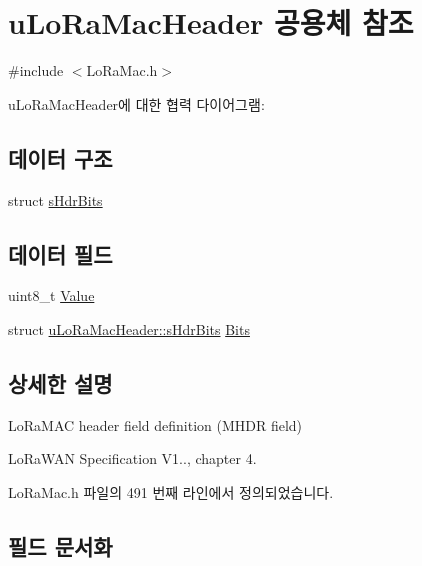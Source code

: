 \hypertarget{unionu_lo_ra_mac_header}{}\section{u\+Lo\+Ra\+Mac\+Header 공용체 참조}
\label{unionu_lo_ra_mac_header}


{\ttfamily \#include $<$Lo\+Ra\+Mac.\+h$>$}



u\+Lo\+Ra\+Mac\+Header에 대한 협력 다이어그램\+:
\subsection*{데이터 구조}
\begin{DoxyCompactItemize}
\item 
struct \mbox{\hyperlink{structu_lo_ra_mac_header_1_1s_hdr_bits}{s\+Hdr\+Bits}}
\end{DoxyCompactItemize}
\subsection*{데이터 필드}
\begin{DoxyCompactItemize}
\item 
uint8\+\_\+t \mbox{\hyperlink{unionu_lo_ra_mac_header_a88f4d00bdab99ae6f48c7ae0bc468bb4}{Value}}
\item 
struct \mbox{\hyperlink{structu_lo_ra_mac_header_1_1s_hdr_bits}{u\+Lo\+Ra\+Mac\+Header\+::s\+Hdr\+Bits}} \mbox{\hyperlink{unionu_lo_ra_mac_header_a2be537c628f62bdb049e4ecd5bec8e6a}{Bits}}
\end{DoxyCompactItemize}


\subsection{상세한 설명}
Lo\+Ra\+M\+AC header field definition (M\+H\+DR field)

Lo\+Ra\+W\+AN Specification V1.., chapter 4. 

Lo\+Ra\+Mac.\+h 파일의 491 번째 라인에서 정의되었습니다.



\subsection{필드 문서화}
\mbox{\label{unionu_lo_ra_mac_header_a2be537c628f62bdb049e4ecd5bec8e6a}} 
